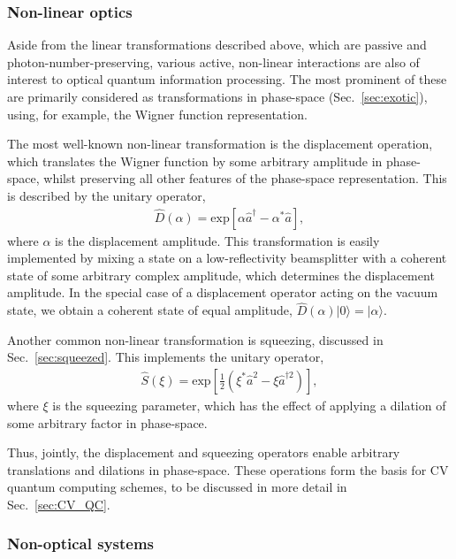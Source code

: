 \documentclass[aps, rmp, twocolumn, amsmath, amssymb, nofootinbib, superscriptaddress, longbibliography, floatfix, table-of-contents, eqsecnum]{revtex4-1}
\newcommand{\ket}[1]{|#1\rangle}
\begin{document}
%
%

\subsubsection{Non-linear optics} \label{sec:non_lin_opt} 

Aside from the linear transformations described above, which are passive and photon-number-preserving, various active, non-linear interactions are also of interest to optical quantum information processing. The most prominent of these are primarily considered as transformations in phase-space (Sec.~\ref{sec:exotic}), using, for example, the Wigner function representation.

The most well-known non-linear transformation is the displacement operation, which translates the Wigner function by some arbitrary amplitude in phase-space, whilst preserving all other features of the phase-space representation. This is described by the unitary operator,
\begin{align}
\hat{D}(\alpha) = \text{exp}\left[\alpha\hat{a}^\dag - \alpha^*\hat{a}\right],
\end{align}
where $\alpha$ is the displacement amplitude. This transformation is easily implemented by mixing a state on a low-reflectivity beamsplitter with a coherent state of some arbitrary complex amplitude, which determines the displacement amplitude. In the special case of a displacement operator acting on the vacuum state, we obtain a coherent state of equal amplitude, \mbox{$\hat{D}(\alpha)\ket{0}=\ket\alpha$}.

Another common non-linear transformation is squeezing, discussed in Sec.~\ref{sec:squeezed}. This implements the unitary operator,
\begin{align}
\hat{S}(\xi) = \text{exp}\left[ \frac{1}{2}(\xi^*\hat{a}^2 - \xi{\hat{a}^{\dag 2}})\right],
\end{align}
where $\xi$ is the squeezing parameter, which has the effect of applying a dilation of some arbitrary factor in phase-space.

Thus, jointly, the displacement and squeezing operators enable arbitrary translations and dilations in phase-space. These operations form the basis for CV quantum computing schemes, to be discussed in more detail in Sec.~\ref{sec:CV_QC}.

%
%

\subsubsection{Non-optical systems}
\end{document}

